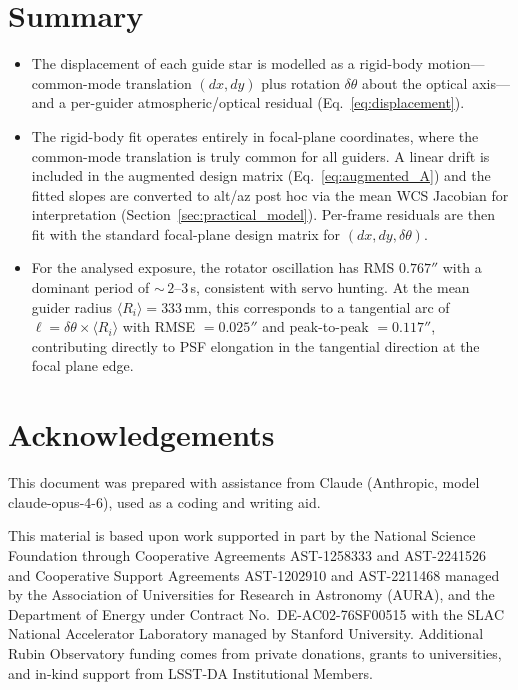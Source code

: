 \documentclass[SE,lsstdraft,authoryear,toc]{lsstdoc}
\begin{document}
\clearpage
\section{Summary}
\label{sec:summary}

\begin{itemize}
\item The displacement of each guide star is modelled as a rigid-body
  motion---common-mode translation $(dx, dy)$ plus rotation
  $\delta\theta$ about the optical axis---and a per-guider
  atmospheric/optical residual (Eq.~\ref{eq:displacement}).

\item The rigid-body fit operates entirely in focal-plane coordinates,
  where the common-mode translation is truly common for all guiders.
  A linear drift is included in the augmented design matrix
  (Eq.~\ref{eq:augmented_A}) and the fitted slopes are converted to
  alt/az post hoc via the mean WCS Jacobian for interpretation
  (Section~\ref{sec:practical_model}).  Per-frame residuals are then
  fit with the standard focal-plane design matrix for
  $(dx, dy, \delta\theta)$.

\item For the analysed exposure, the rotator oscillation has RMS
  $0.767''$ with a dominant period of ${\sim}\,2$--$3$\,s, consistent
  with servo hunting.  At the mean guider radius
  $\langle R_i \rangle = 333$\,mm, this corresponds to a tangential
  arc of $\ell = \delta\theta \times \langle R_i \rangle$ with RMSE
  $= 0.025''$ and peak-to-peak $= 0.117''$, contributing directly to
  PSF elongation in the tangential direction at the focal plane edge.
\end{itemize}

\appendix

\section{Acknowledgements}

This document was prepared with assistance from Claude (Anthropic,
model claude-opus-4-6), used as a coding and writing aid.

This material is based upon work supported in part by the National Science Foundation through Cooperative Agreements AST-1258333 and AST-2241526 and Cooperative Support Agreements AST-1202910 and AST-2211468 managed by the Association of Universities for Research in Astronomy (AURA), and the Department of Energy under Contract No.\ DE-AC02-76SF00515 with the SLAC National Accelerator Laboratory managed by Stanford University.
Additional Rubin Observatory funding comes from private donations, grants to universities, and in-kind support from LSST-DA Institutional Members.
\end{document}
